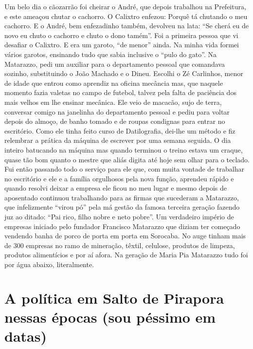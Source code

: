 \documentclass[12pt,brazil,]{book}
\begin{document}
Um belo dia o cãozarrão foi cheirar o André, que depois trabalhou na
Prefeitura, e este ameaçou chutar o cachorro. O Calixtro enfezou: Porquê
tá chutando o meu cachorro. E o André, bem enfezadinho também, devolveu
na lata: ``Se cherá eu de novo eu chuto o cachorro e chuto o dono
tamém''. Foi a primeira pessoa que vi desafiar o Calixtro. E era um
garoto, ``de menor'' ainda. Na minha vida formei vários garotos,
ensinando tudo que sabia inclusive o ``pulo do gato''. Na Matarazzo,
pedi um auxiliar para o departamento pessoal que comandava sozinho,
substituindo o João Machado e o Dineu. Escolhi o Zé Carlinhos, menor de
idade que entrou como aprendiz na oficina mecância mas, que naquele
momento fazia valetas no campo de futebol, talvez pela falta de
paciência dos mais velhos em lhe ensinar mecânica. Ele veio de macacão,
sujo de terra, conversar comigo na janelinha do departamento pessoal e
pediu para voltar depois do almoço, de banho tomado e de roupas
condignas para entrar no escritório. Como ele tinha feito curso de
Datilografia, dei-lhe um método e fiz relembrar a prática da máquina de
escrever por uma semana seguida. O dia inteiro batucando na máquina mas
quando terminou o treino estava um craque, quase tão bom quanto o mestre
que aliás digita até hoje sem olhar para o teclado. Fui então passando
todo o serviço para ele que, com muita vontade de trabalhar no
escritório e ele e a família orgulhosos pela nova função, aprendeu
rápido e quando resolvi deixar a empresa ele ficou no meu lugar e mesmo
depois de aposentado continuou trabalhando para as firmas que sucederam
a Matarazzo, que infelizmente ``virou pó'' pela má gestão da famosa
terceira geração fazendo juz ao ditado: ``Pai rico, filho nobre e neto
pobre''. Um verdadeiro império de empresas iniciado pelo fundador
Francisco Matarazzo que diziam ter começado vendendo banha de porco de
porta em porta em Sorocaba. No auge tinham mais de 300 empresas no ramo
de mineração, têxtil, celulose, produtos de limpeza, produtos
alimentícios e por aí afora. Na geração de Maria Pia Matarazzo tudo foi
por água abaixo, literalmente.

\section{A política em Salto de Pirapora nessas épocas (sou péssimo em
datas)}\label{a-poluxedtica-em-salto-de-pirapora-nessas-uxe9pocas-sou-puxe9ssimo-em-datas}
\end{document}
